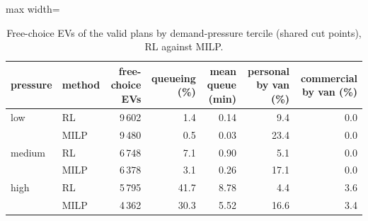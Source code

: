 \begin{table}[H]\centering
\small
\caption{Free-choice EVs of the valid plans by demand-pressure tercile (shared cut points), RL against MILP.}\label{tab:pressure}
\begin{adjustbox}{max width=\textwidth}\begin{tabular}{llrrrrr}\toprule
pressure & method & free-choice EVs & queueing (\%) & mean queue (min) & personal by van (\%) & commercial by van (\%) \\ \midrule
low & RL & 9\,602 & 1.4 & 0.14 & 9.4 & 0.0 \\
 & MILP & 9\,480 & 0.5 & 0.03 & 23.4 & 0.0 \\
medium & RL & 6\,748 & 7.1 & 0.90 & 5.1 & 0.0 \\
 & MILP & 6\,378 & 3.1 & 0.26 & 17.1 & 0.0 \\
high & RL & 5\,795 & 41.7 & 8.78 & 4.4 & 3.6 \\
 & MILP & 4\,362 & 30.3 & 5.52 & 16.6 & 3.4 \\
\bottomrule\end{tabular}\end{adjustbox}\end{table}
